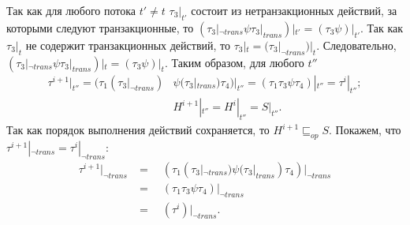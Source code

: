 \begin{myproof}
\begin{enumerate}[listparindent=1.5em]
Так как для любого потока $t' \neq t$ $\tau_3|_{t'}$ состоит из нетранзакционных действий, за которыми следуют транзакционные, то $(\tau_3|_{\neg trans}\psi\tau_3|_{trans})|_{t'} = (\tau_3\psi)|_{t'}$. Так как $\tau_3|_t$ не содержит транзакционных действий, то $\tau_3|_t = (\tau_3|_{\neg trans})|_t$. Следовательно, $(\tau_3|_{\neg trans}\psi\tau_3|_{trans})|_t = (\tau_3\psi)|_t$. Таким образом, для любого $t''$
\begin{align*}
\tau^{i+1}|_{t''} = (\tau_1(\tau_3|_{\neg trans})&\psi(\tau_3|_{trans})\tau_4)|_{t''} = (\tau_1\tau_3\psi\tau_4)|_{t''} = \tau^i|_{t''}; \\   
&H^{i+1}|_{t''} = H^i|_{t''} = S|_{t''}.
\end{align*}
Так как порядок выполнения действий сохраняется, то $H^{i+1} \sqsubseteq_{op} S$. Покажем, что $\tau^{i+1}|_{\neg trans} = \tau^{i}|_{\neg trans}$:
\begin{align*}
\tau^{i+1}|_{\neg trans} &= \quad (\tau_1(\tau_3|_{\neg trans})\psi(\tau_3|_{trans})\tau_4)|_{\neg trans}  \\
                         &= \quad (\tau_1\tau_3\psi\tau_4)|_{\neg trans} \\
                         &= \quad (\tau^i)|_{\neg trans}.
\end{align*}
\end{enumerate}
\end{myproof}

